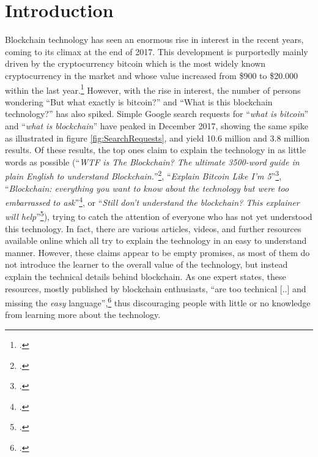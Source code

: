 \chapter{Introduction}
\label{chapter:Intro}

Blockchain technology has seen an enormous rise in interest in the recent years, coming to its climax at the end of 2017. This development is purportedly mainly driven by the cryptocurrency bitcoin which is the most widely known cryptocurrency in the market and whose value increased from \$900 to \$20.000 within the last year.\footcite[Cf.][]{Higgins900200002017}
However, with the rise in interest, the number of persons wondering \enquote{But what exactly is bitcoin?} and \enquote{What is this blockchain technology?} has also spiked. Simple Google search requests for \enquote{\textit{what is bitcoin}} and \enquote{\textit{what is blockchain}} have peaked in December 2017, showing the same spike as illustrated in figure \ref{fig:SearchRequests}, and yield 10.6 million and 3.8 million results. Of these results, the top ones claim to explain the technology in as little words as possible (\enquote{\textit{WTF is The Blockchain?
The ultimate 3500-word guide in plain English to understand Blockchain.}}\footcite{MamoriaWTFBlockchain2017}, \enquote{\textit{Explain Bitcoin Like I'm 5}}\footcite{CustodioExplainBitcoinFive2013}, \enquote{\textit{Blockchain: everything you want to know about the technology but were too embarrassed to ask}}\footcite{HeathmannBlockchaineverythingyou2018}, or \enquote{\textit{Still don't understand the blockchain? This explainer will help}}\footcite{LeighSinodStilldonunderstand2018}), trying to catch the attention of everyone who has not yet understood this technology. In fact, there are various articles, videos, and further resources available online which all try to explain the technology in an easy to understand manner. However, these claims appear to be empty promises, as most of them do not introduce the learner to the overall value of the technology, but instead explain the technical details behind blockchain. As one expert states, these resources, mostly published by blockchain enthusiasts, \enquote{are too technical [..] and missing the \textit{easy} language},\footcite[Cf.][P19, P20]{DanielKaltenbach_Interview} thus discouraging people with little or no knowledge from learning more about the technology.

